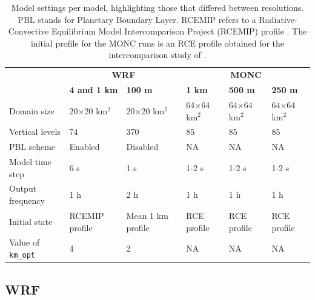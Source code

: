 \documentclass[draft]{agujournal2019}
\begin{document}
{
\begin{table}
    \centering
    \caption{Model settings per model, highlighting those that differed between
    resolutions. PBL stands for Planetary Boundary Layer. RCEMIP refers to a
    Radiative-Convective Equilibrium Model Intercomparison Project (RCEMIP)
    profile \cite{Wing_GMD_2018}. The initial profile for the MONC runs is an RCE profile obtained for the intercomparison study of .}
    \label{tab:model_setups}
    \renewcommand{\arraystretch}{0.65}
    \footnotesize
    \begin{tabular}{lll|lll}
        & \multicolumn{2}{c|}{\textbf{WRF}} & \multicolumn{3}{c}{\textbf{MONC}} \\
        & \textbf{4 and 1 km} & \textbf{100 m} & \textbf{1 km} & \textbf{500 m} & \textbf{250 m} \\
        \hline
        Domain size & 20$\times$20 km$^2$ & 20$\times$20 km$^2$ & 64$\times$64 km$^2$ & 64$\times$64 km$^2$ & 64$\times$64 km$^2$ \\
        Vertical levels & 74 & 370 & 85 & 85 & 85 \\
        PBL scheme & Enabled & Disabled & NA & NA & NA \\
        Model time step & 6 s & 1 s & 1-2 s & 1-2 s & 1-2 s\\
        Output frequency & 1 h & 2 h & 1 h & 1 h & 1 h \\
        Initial state & RCEMIP profile & Mean 1 km profile & RCE profile & RCE profile & RCE profile \\
        Value of \texttt{km\_opt} & 4 & 2 & NA & NA & NA \\
        \hline
    \end{tabular}
\end{table}
}

\subsection{WRF}
\end{document}
